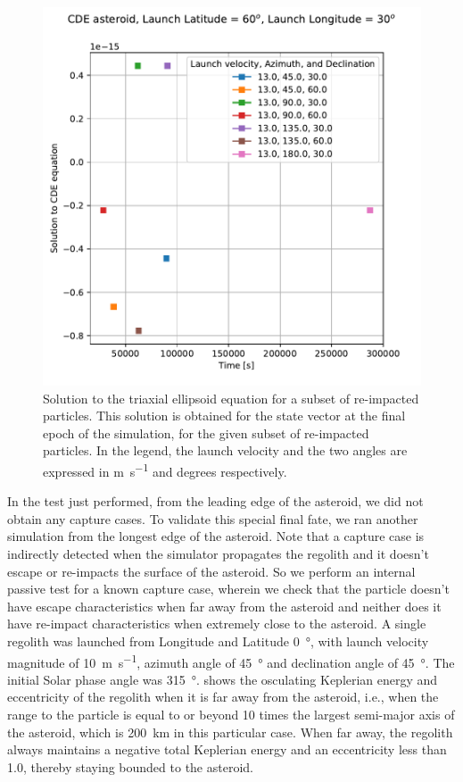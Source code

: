 \begin{figure}[htb]
\centering
\captionsetup{justification=centering}
\includegraphics[width=\textwidth, height=0.4\textheight, keepaspectratio=true]{Images/crash_vv.pdf}
\caption{Solution to the triaxial ellipsoid equation for a subset of re-impacted particles. This solution is obtained for the state vector at the final epoch of the simulation, for the given subset of re-impacted particles. In the legend, the launch velocity and the two angles are expressed in \si{\metre \per \second} and degrees respectively.}
\label{fig:finalfate_vv_crash}
\end{figure}
\FloatBarrier
In the test just performed, from the leading edge of the asteroid, we did not obtain any capture cases. To validate this special final fate, we ran another simulation from the longest edge of the asteroid. Note that a capture case is indirectly detected when the simulator propagates the regolith and it doesn't escape or re-impacts the surface of the asteroid. So we perform an internal passive test for a known capture case, wherein we check that the particle doesn't have escape characteristics when far away from the asteroid and neither does it have re-impact characteristics when extremely close to the asteroid.
%
\newline\newline
%
A single regolith was launched from Longitude and Latitude \SI{0}{\degree}, with launch velocity magnitude of \SI{10}{\metre \per \second}, azimuth angle of \SI{45}{\degree} and declination angle of \SI{45}{\degree}. The initial Solar phase angle was \SI{315}{\degree}.  shows the osculating Keplerian energy and eccentricity of the regolith when it is far away from the asteroid, i.e., when the range to the particle is equal to or beyond 10 times the largest semi-major axis of the asteroid, which is \SI{200}{\kilo \metre} in this particular case. When far away, the regolith always maintains a negative total Keplerian energy and an eccentricity less than 1.0, thereby staying bounded to the asteroid.
